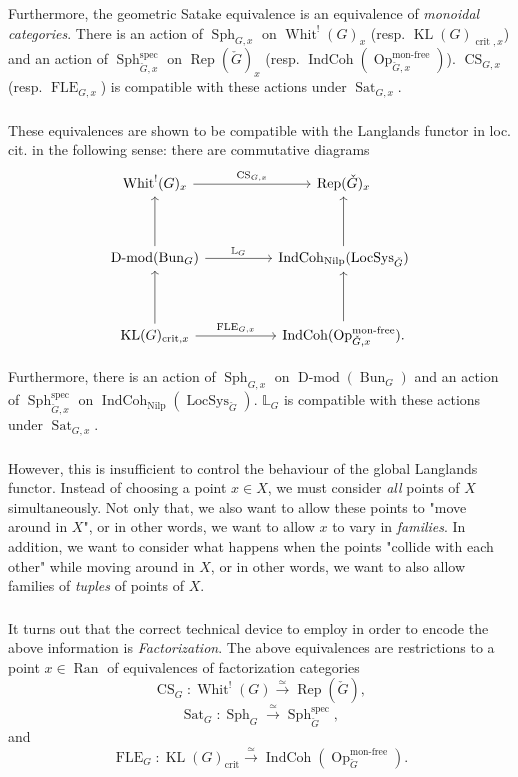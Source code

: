 \documentclass[10pt]{amsart}
\theoremstyle{remark}
\newcommand{\on}[1]{\operatorname{#1}}
\newcommand{\Bun}{\on{Bun}}
\newcommand{\Dmod}{\on{D-mod}}
\newcommand{\IndCoh}{\on{IndCoh}}
\newcommand{\Gcheck}{\check{G}}
\newcommand{\Ran}{\on{Ran}}
\newcommand{\sssec}[1]{\subsubsection{}}
\begin{document}
Furthermore, the geometric Satake equivalence is an equivalence of \emph{monoidal categories}. There is an action of $\on{Sph}_{G, x}$ on $\on{Whit}^!(G)_{x}$ (resp. $\on{KL}(G)_{\on{crit}, x}$) and an action of $\on{Sph}_{\Gcheck, x}^{\on{spec}}$ on $\on{Rep}(\Gcheck)_x$ (resp. $\IndCoh(\on{Op}_{\Gcheck, x}^{\on{mon-free}})$). $\on{CS}_{G, x}$ (resp. $\on{FLE}_{G, x}$) is compatible with these actions under $\on{Sat}_{G, x}$.

\sssec{}
These equivalences are shown to be compatible with the Langlands functor in loc. cit. in the following sense: there are commutative diagrams
$$
\begin{tikzcd}
	{\on{Whit}^!(G)_{x}} && {\on{Rep}(\Gcheck)_{x}} \\
	\\
	{\Dmod(\Bun_G)} && {\IndCoh_{\on{Nilp}}(\on{LocSys}_{\Gcheck})} \\
	\\
	{\on{KL}(G)_{\on{crit}, x}} && {\IndCoh(\on{Op}_{\Gcheck, x}^{\on{mon-free}}).}
	\arrow["{\on{CS}_{G, x}}", from=1-1, to=1-3]
	\arrow[from=3-1, to=1-1]
	\arrow["{\mathbb{L}_G}", from=3-1, to=3-3]
	\arrow[from=3-3, to=1-3]
	\arrow[from=5-1, to=3-1]
	\arrow["{\on{FLE}_{G, x}}", from=5-1, to=5-3]
	\arrow[from=5-3, to=3-3]
\end{tikzcd}
$$

Furthermore, there is an action of $\on{Sph}_{G, x}$ on $\Dmod(\Bun_G)$ and an action of $\on{Sph}_{\Gcheck, x}^{\on{spec}}$ on $\IndCoh_{\on{Nilp}}(\on{LocSys}_{\Gcheck})$. $\mathbb{L}_G$ is compatible with these actions under $\on{Sat}_{G,x}$.

\sssec{}
However, this is insufficient to control the behaviour of the global Langlands functor. Instead of choosing a point $x \in X$, we must consider \emph{all} points of $X$ simultaneously. Not only that, we also want to allow these points to "move around in $X$", or in other words, we want to allow $x$ to vary in \emph{families}. In addition, we want to consider what happens when the points "collide with each other" while moving around in $X$, or in other words, we want to also allow families of \emph{tuples} of points of $X$.

\sssec{}
It turns out that the correct technical device to employ in order to encode the above information is \emph{Factorization}. The above equivalences are restrictions to a point $x \in \Ran$ of equivalences of factorization categories
$$
\on{CS}_{G} : \on{Whit}^!(G) \overset{\simeq}{\longrightarrow} \on{Rep}(\Gcheck),
$$
$$
\on{Sat}_{G} : \on{Sph}_{G} \overset{\simeq}{\longrightarrow} \on{Sph}_{\Gcheck}^{\on{spec}},
$$
and
$$
\on{FLE}_{G} : \on{KL}(G)_{\on{crit}} \overset{\simeq}{\longrightarrow} \IndCoh(\on{Op}_{\Gcheck}^{\on{mon-free}}).
$$
\end{document}
